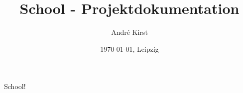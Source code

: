 \documentclass[11pt]{book}
\author{André Kirst}
\date{\today{}, Leipzig}
\title{School - Projektdokumentation}
\begin{document}
School!


\end{document}
